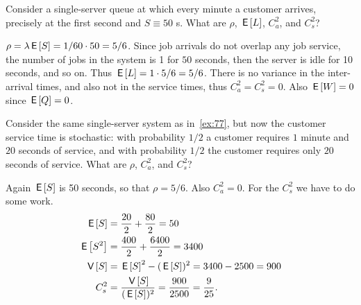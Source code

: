 \begin{exercise}\label{ex:77}
 Consider  a single-server queue at which every minute a customer arrives, precisely at the first second and $S\equiv 50$ s.
 What are $\rho$, $\,\mathsf{E}\left[L\right]$, $C_a^2$, and $C_s^2$?
\begin{solution}
 $\rho = \lambda \,\mathsf{E}\left[S\right] = 1/60 \cdot 50 = 5/6$.
 Since job arrivals do not overlap any job service, the number of jobs in the system is 1 for $50$ seconds, then the server is idle for 10 seconds, and so on.
 Thus $\,\mathsf{E}\left[L\right] = 1\cdot5/6 = 5/6$.
 There is no variance in the inter-arrival times, and also not in the service times, thus $C_a^2 = C_s^2 = 0$.
 Also $\,\mathsf{E}\left[W\right]=0$ since $\,\mathsf{E}\left[Q\right]=0$.
\end{solution}
\end{exercise}

\begin{exercise}\label{ex:76}
 Consider the same single-server system as in~\cref{ex:77}, but now the customer service time is stochastic: with probability $1/2$ a customer requires $1$ minute and $20$ seconds of service, and with probability $1/2$ the customer requires only $20$ seconds of service.
 What are $\rho$, $C_a^2$, and $C_s^2$?
\begin{solution}
 Again $\,\mathsf{E}\left[S\right]$ is 50 seconds, so that $\rho = 5/6$. Also
 $C_a^2=0$. For the $C_s^2$ we have to do some work.
 \begin{equation*}
 \begin{split}
 \,\mathsf{E}\left[S\right] &= \frac{20}2 + \frac{80}2 = 50 \\
 \,\mathsf{E}\left[S^2\right] &= \frac{400}2 + \frac{6400} 2 = 3400 \\
 \,\mathsf{V}\left[S\right] &= \,\mathsf{E}\left[S\right]^2 - (\,\mathsf{E}\left[S\right])^2 = 3400 - 2500 = 900 \\
 C_s^2 &= \frac{\,\mathsf{V}\left[S\right]}{(\,\mathsf{E}\left[S\right])^2} = \frac{900}{2500}=\frac{9}{25}.
 \end{split}
 \end{equation*}
\end{solution}
\end{exercise}


